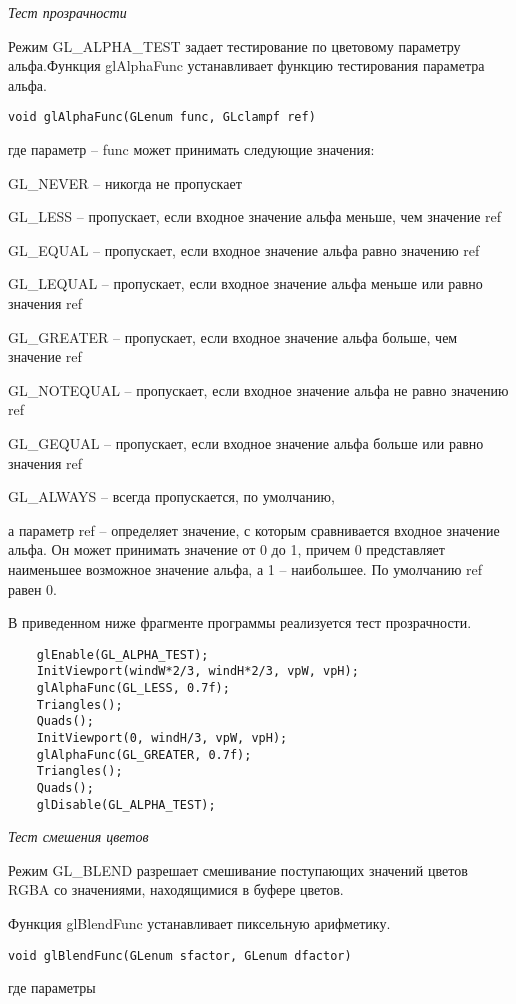 \textit{Тест прозрачности}

Режим GL\_ALPHA\_TEST задает тестирование по цветовому параметру альфа.Функция glAlphaFunc устанавливает функцию тестирования параметра альфа.

\texttt{void glAlphaFunc(GLenum func, GLclampf ref)}

где параметр – func может принимать следующие значения:

GL\_NEVER – никогда не пропускает

GL\_LESS – пропускает, если входное значение альфа меньше, чем значение ref

GL\_EQUAL – пропускает, если входное значение альфа равно значению ref

GL\_LEQUAL – пропускает, если входное значение альфа меньше или равно значения ref

GL\_GREATER – пропускает, если входное значение альфа больше, чем значение ref

GL\_NOTEQUAL – пропускает, если входное значение альфа не равно значению ref

GL\_GEQUAL – пропускает, если входное значение альфа больше или равно значения ref

GL\_ALWAYS – всегда пропускается, по умолчанию,

а параметр ref – определяет значение, с которым сравнивается входное значение альфа.
Он может принимать значение от 0 до 1, причем 0 представляет наименьшее возможное значение альфа, а 1 – наибольшее.
По умолчанию ref равен 0.

В приведенном ниже фрагменте программы реализуется тест прозрачности.

\small
\begin{verbatim}
    glEnable(GL_ALPHA_TEST);
    InitViewport(windW*2/3, windH*2/3, vpW, vpH);
    glAlphaFunc(GL_LESS, 0.7f);
    Triangles();
    Quads();
    InitViewport(0, windH/3, vpW, vpH);
    glAlphaFunc(GL_GREATER, 0.7f);
    Triangles();
    Quads();
    glDisable(GL_ALPHA_TEST);
\end{verbatim}
\normalsize

\textit{Тест смешения цветов}

Режим GL\_BLEND разрешает смешивание поступающих значений цветов RGBA со значениями, находящимися в буфере цветов.

Функция glBlendFunc устанавливает пиксельную арифметику.

\texttt{void glBlendFunc(GLenum sfactor, GLenum dfactor)}

где параметры

